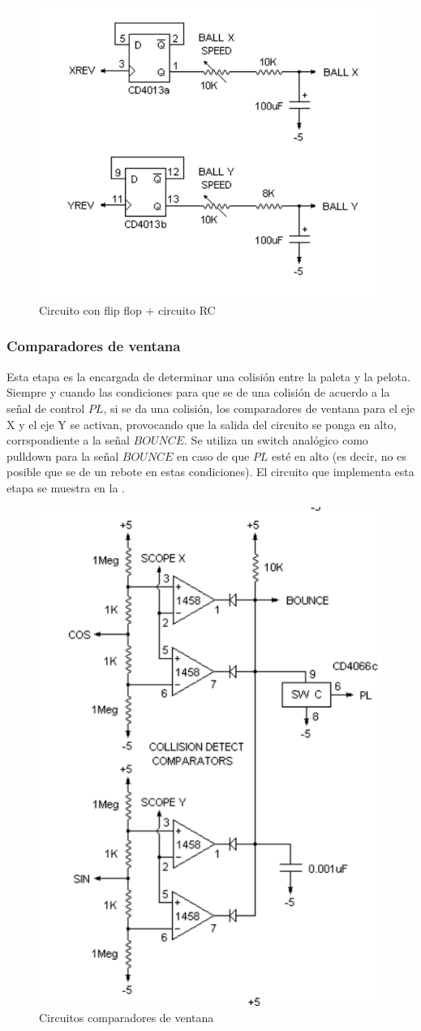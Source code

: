 \begin{figure}[H]
    \centering
    \includegraphics[width=0.5\linewidth]{figs/descripcion/ffRC.png}
    \caption{Circuito con flip flop + circuito RC \cite{pong}}
    \label{ffRC}
\end{figure}

\subsubsection{Comparadores de ventana}
Esta etapa es la encargada de determinar una colisión entre la paleta y la pelota.
Siempre y cuando las condiciones para que se de una colisión de acuerdo a la señal de control $PL$, si se da una colisión, los comparadores de ventana para el eje X y el eje Y se activan, provocando que la salida del circuito se ponga en alto, corrspondiente a la señal $BOUNCE$.
Se utiliza un switch analógico como pulldown para la señal $BOUNCE$ en caso de que $PL$ esté en alto (es decir, no es posible que se de un rebote en estas condiciones).
El circuito que implementa esta etapa se muestra en la .

\begin{figure}[H]
    \centering
    \includegraphics[width=0.5\linewidth]{figs/descripcion/comparadores}
    \caption{Circuitos comparadores de ventana \cite{pong}}
    \label{comparadores}
\end{figure}

